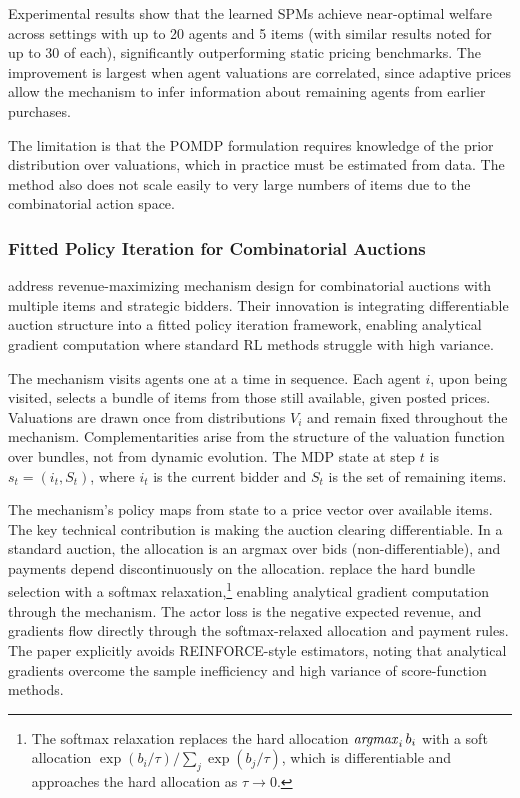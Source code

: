 Experimental results show that the learned SPMs achieve near-optimal welfare across settings with up to 20 agents and 5 items (with similar results noted for up to 30 of each), significantly outperforming static pricing benchmarks. The improvement is largest when agent valuations are correlated, since adaptive prices allow the mechanism to infer information about remaining agents from earlier purchases.

The limitation is that the POMDP formulation requires knowledge of the prior distribution over valuations, which in practice must be estimated from data. The method also does not scale easily to very large numbers of items due to the combinatorial action space.


\subsubsection{Fitted Policy Iteration for Combinatorial Auctions}

\citet{RavindranathEtAl2024} address revenue-maximizing mechanism design for combinatorial auctions with multiple items and strategic bidders. Their innovation is integrating differentiable auction structure into a fitted policy iteration framework, enabling analytical gradient computation where standard RL methods struggle with high variance.

The mechanism visits agents one at a time in sequence. Each agent $i$, upon being visited, selects a bundle of items from those still available, given posted prices. Valuations are drawn once from distributions $V_i$ and remain fixed throughout the mechanism. Complementarities arise from the structure of the valuation function over bundles, not from dynamic evolution. The MDP state at step $t$ is $s_t = (i_t, S_t)$, where $i_t$ is the current bidder and $S_t$ is the set of remaining items.

The mechanism's policy maps from state to a price vector over available items. The key technical contribution is making the auction clearing differentiable. In a standard auction, the allocation is an argmax over bids (non-differentiable), and payments depend discontinuously on the allocation. \citet{RavindranathEtAl2024} replace the hard bundle selection with a softmax relaxation,\footnote{The softmax relaxation replaces the hard allocation $\mathop{\it argmax}_i b_i$ with a soft allocation $\exp(b_i/\tau)/\sum_j \exp(b_j/\tau)$, which is differentiable and approaches the hard allocation as $\tau \to 0$.} enabling analytical gradient computation through the mechanism. The actor loss is the negative expected revenue, and gradients flow directly through the softmax-relaxed allocation and payment rules. The paper explicitly avoids REINFORCE-style estimators, noting that analytical gradients overcome the sample inefficiency and high variance of score-function methods.

